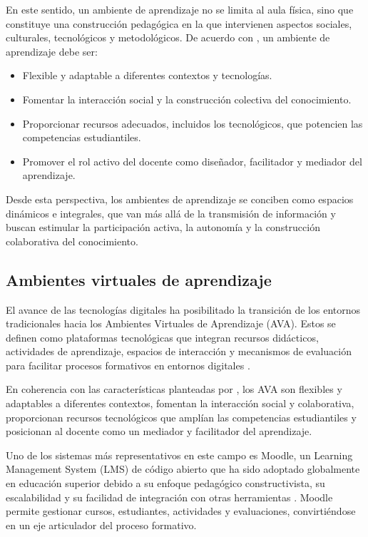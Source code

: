 \documentclass[letter,oneside,12pt,spanish]{report}
\begin{document}
En este sentido, un ambiente de aprendizaje no se limita al aula física, sino que constituye una construcción pedagógica en la que intervienen aspectos sociales, culturales, tecnológicos y metodológicos. De acuerdo con \textcite{castro2019}, un ambiente de aprendizaje debe ser:

\begin{itemize}
	\item Flexible y adaptable a diferentes contextos y tecnologías.
	\item Fomentar la interacción social y la construcción colectiva del conocimiento.
	\item Proporcionar recursos adecuados, incluidos los tecnológicos, que potencien las competencias estudiantiles.
	\item Promover el rol activo del docente como diseñador, facilitador y mediador del aprendizaje.
\end{itemize}

Desde esta perspectiva, los ambientes de aprendizaje se conciben como espacios dinámicos e integrales, que van más allá de la transmisión de información y buscan estimular la participación activa, la autonomía y la construcción colaborativa del conocimiento.

\subsection{Ambientes virtuales de aprendizaje}

El avance de las tecnologías digitales ha posibilitado la transición de los entornos tradicionales hacia los Ambientes Virtuales de Aprendizaje (AVA). Estos se definen como plataformas tecnológicas que integran recursos didácticos, actividades de aprendizaje, espacios de interacción y mecanismos de evaluación para facilitar procesos formativos en entornos digitales \parencite{salinas2004}.

En coherencia con las características planteadas por \textcite{castro2019}, los AVA son flexibles y adaptables a diferentes contextos, fomentan la interacción social y colaborativa, proporcionan recursos tecnológicos que amplían las competencias estudiantiles y posicionan al docente como un mediador y facilitador del aprendizaje.

Uno de los sistemas más representativos en este campo es Moodle, un Learning Management System (LMS) de código abierto que ha sido adoptado globalmente en educación superior debido a su enfoque pedagógico constructivista, su escalabilidad y su facilidad de integración con otras herramientas \parencite{dougiamas2003}. Moodle permite gestionar cursos, estudiantes, actividades y evaluaciones, convirtiéndose en un eje articulador del proceso formativo.
\end{document}
